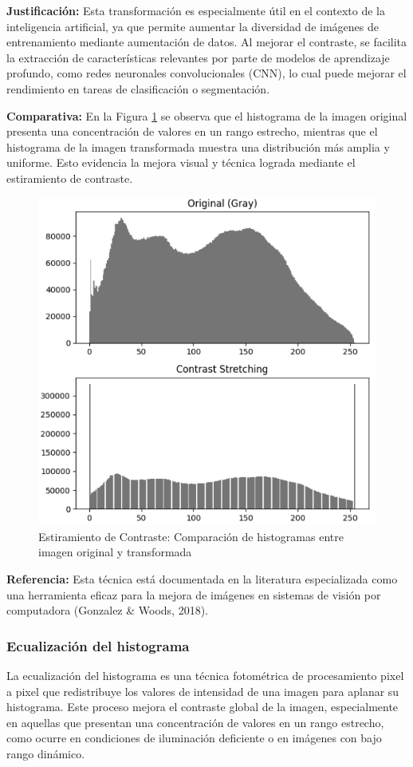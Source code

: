 \documentclass[12pt,letterpaper]{article}
\begin{document}
\textbf{Justificación:} Esta transformación es especialmente útil en el contexto de la inteligencia artificial, ya que permite aumentar la diversidad de imágenes de entrenamiento mediante aumentación de datos. Al mejorar el contraste, se facilita la extracción de características relevantes por parte de modelos de aprendizaje profundo, como redes neuronales convolucionales (CNN), lo cual puede mejorar el rendimiento en tareas de clasificación o segmentación.

\textbf{Comparativa:} En la Figura \ref{fig:estiramiento_de_contraste_justificacion} se observa que el histograma de la imagen original presenta una concentración de valores en un rango estrecho, mientras que el histograma de la imagen transformada muestra una distribución más amplia y uniforme. Esto evidencia la mejora visual y técnica lograda mediante el estiramiento de contraste.

\begin{figure}[H]
  \centering
  \includegraphics[width=0.8\linewidth]{figuras/estiramiento_de_contraste_justificacion.png}
  \caption{Estiramiento de Contraste: Comparación de histogramas entre imagen original y transformada}
  \label{fig:estiramiento_de_contraste_justificacion}
\end{figure}

\textbf{Referencia:} Esta técnica está documentada en la literatura especializada como una herramienta eficaz para la mejora de imágenes en sistemas de visión por computadora (Gonzalez & Woods, 2018).

\subsubsection{Ecualización del histograma}
La ecualización del histograma es una técnica fotométrica de procesamiento pixel a pixel que redistribuye los valores de intensidad de una imagen para aplanar su histograma. Este proceso mejora el contraste global de la imagen, especialmente en aquellas que presentan una concentración de valores en un rango estrecho, como ocurre en condiciones de iluminación deficiente o en imágenes con bajo rango dinámico.
\end{document}
